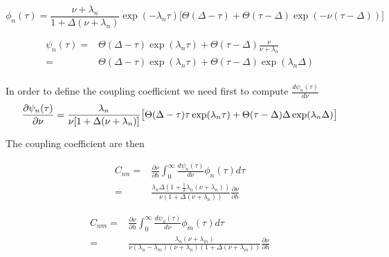 \documentclass[a4paper,11pt,twoside]{article}
\numberwithin{equation}{section}
\begin{document}

\begin{equation}
\phi_n(\tau)= \frac{\nu+\lambda_n}{1+\Delta(\nu+\lambda_n)}\exp(-\lambda_n\tau)\big[\Theta(\Delta-\tau) +  \Theta(\tau-\Delta) \exp(-\nu(\tau-\Delta))\big]
\end{equation}


\begin{align}
\psi_n(\tau)=&\Theta(\Delta-\tau)\exp(\lambda_n\tau) +  \Theta(\tau-\Delta) \frac{\nu}{\nu+\lambda_n}\\
=&\Theta(\Delta-\tau)\exp(\lambda_n\tau) +  \Theta(\tau-\Delta) \exp(\lambda_n\Delta)\\
\end{align}



In order to define the coupling coefficient we need first to compute $\frac{d\psi_n(\tau)}{d\nu}$ 
\begin{equation}
\frac{\partial\psi_n(\tau)}{\partial\nu}=\frac{\lambda_n}{\nu[1+\Delta(\nu+\lambda_n)]}\big[\Theta(\Delta-\tau)\tau\exp(\lambda_n\tau) +  \Theta(\tau-\Delta)\Delta \exp(\lambda_n\Delta)\big]\\
\end{equation}

The coupling coefficient are then 

\begin{align}
C_{nn}=&\frac{\partial \nu}{\partial h}\int_0^\infty\frac{d\psi_n(\tau)}{d\nu}\phi_n(\tau)d\tau \nonumber\\
=&\frac{\lambda_n\Delta(1+\frac{1}{2}\lambda_n(\nu+\lambda_n))}{\nu(1+\Delta(\nu+\lambda_n))}\frac{\partial \nu}{\partial h}
\end{align}


\begin{align}
C_{nm}=&\frac{\partial \nu}{\partial h}\int_0^\infty\frac{d\psi_n(\tau)}{d\nu}\phi_m(\tau)d\tau \nonumber\\
=&\frac{\lambda_n(\nu+\lambda_m)}{\nu(\lambda_n-\lambda_m)(\nu+\lambda_n)(1+\Delta(\nu+\lambda_m))}\frac{\partial \nu}{\partial h}
\end{align}
\end{document}
